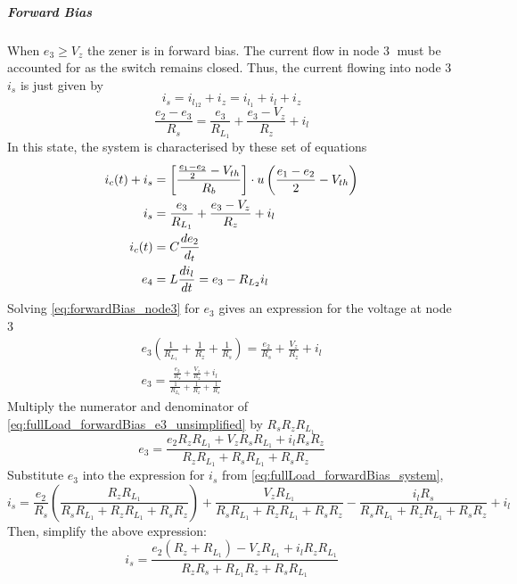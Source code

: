 \subparagraph{Forward Bias}
When $e_3 \geq V_z$ the zener is in forward bias. The current flow in node \textcircled{3} must be accounted for as the switch remains closed. Thus, the current flowing into node \textcircled{3} $i_s$ is just given by $$i_s = i_{l_{12}} + i_z = i_{l_1} + i_l + i_z$$
\begin{equation}
	\frac{e_2 - e_3}{R_s} = \frac{e_3}{R_{L_1}} + \frac{e_3 - V_z}{R_z} + i_l
	\label{eq:forwardBias_node3}
\end{equation}
In this state, the system is characterised by these set of equations
\begin{align}
	i_c(t) + i_s &= \left[\frac{\frac{e_1 - e_2}{2} - V_{th}}{R_b} \right]\cdot u\left(\frac{e_1 - e_2}{2} - V_{th} \right) \\
	i_s &= \frac{e_3}{R_{L_1}} + \frac{e_3 - V_z}{R_z} + i_l \\
	i_c(t) &= C \frac{de_2}{d_t} \\
	e_4 &= L\frac{di_l}{dt} = e_3 - R_{L_2}i_l
	\label{eq:fullLoad_forwardBias_system}
\end{align}
Solving \eqref{eq:forwardBias_node3} for $e_3$ gives an expression for the voltage at node \textcircled{3}
\begin{equation}
\begin{split}
	e_3\left(\frac{1}{R_{L_1}} + \frac{1}{R_z} + \frac{1}{R_s}\right) = \frac{e_2}{R_s} + \frac{V_z}{R_z} + i_l \\
		e_3 = \frac{\frac{e_2}{R_s} + \frac{V_z}{R_z} + i_l}{\frac{1}{R_{L_1}} + \frac{1}{R_z} + \frac{1}{R_s}}
\end{split}
\label{eq:fullLoad_forwardBias_e3_unsimplified}
\end{equation}
Multiply the numerator and denominator of \eqref{eq:fullLoad_forwardBias_e3_unsimplified} by  $R_sR_zR_{L_1}$
\begin{equation}
 e_3 = \frac{e_2 R_z R_{L_1} + V_z R_s R_{L_1} + i_l R_s R_z}{R_z R_{L_1} + R_s R_{L_1} + R_s R_z}
\label{eq:fullLoad_forwardBias_e3}
\end{equation}
Substitute $e_3$ into the expression for $i_s$ from \eqref{eq:fullLoad_forwardBias_system},
\begin{equation}
i_s = \frac{e_2}{R_s} \left(\frac{R_z R_{L_1}}{R_s R_{L_1} + R_z R_{L_1} + R_s R_z}\right) + \frac{V_z R_{L_1}}{R_s R_{L_1} + R_z R_{L_1} + R_s R_z} - \frac{i_l R_s}{R_s R_{L_1} + R_z R_{L_1} + R_s R_z} + i_l
\end{equation}
Then, simplify the above expression:
\begin{equation}
i_s = \frac{e_2 (R_z + R_{L_1}) - V_z R_{L_1} + i_l R_z R_{L_1}}{R_z R_s + R_{L_1} R_z + R_s R_{L_1}}
\end{equation}
